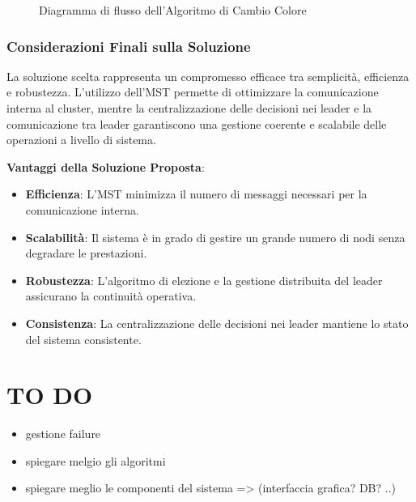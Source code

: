 \documentclass[12pt, a4paper]{report}
\begin{document}
\begin{figure}[ht!]
\centering
{}
\caption{Diagramma di flusso dell'Algoritmo di Cambio Colore}
\label{fig:flow_cambio_colore}
\end{figure}




\subsubsection{Considerazioni Finali sulla Soluzione}

La soluzione scelta rappresenta un compromesso efficace tra semplicità, efficienza e robustezza. L'utilizzo dell'MST permette di ottimizzare la comunicazione interna al cluster, mentre la centralizzazione delle decisioni nei leader e la comunicazione tra leader garantiscono una gestione coerente e scalabile delle operazioni a livello di sistema.

\textbf{Vantaggi della Soluzione Proposta}:

\begin{itemize}
    \item \textbf{Efficienza}: L'MST minimizza il numero di messaggi necessari per la comunicazione interna.
    \item \textbf{Scalabilità}: Il sistema è in grado di gestire un grande numero di nodi senza degradare le prestazioni.
    \item \textbf{Robustezza}: L'algoritmo di elezione e la gestione distribuita del leader assicurano la continuità operativa.
    \item \textbf{Consistenza}: La centralizzazione delle decisioni nei leader mantiene lo stato del sistema consistente.
\end{itemize}

\newpage

\section*{TO DO}
\begin{itemize}
    \item gestione failure
    \item spiegare melgio gli algoritmi
    \item spiegare meglio le componenti del sistema => (interfaccia grafica? DB? ..)
\end{itemize}
\end{document}
